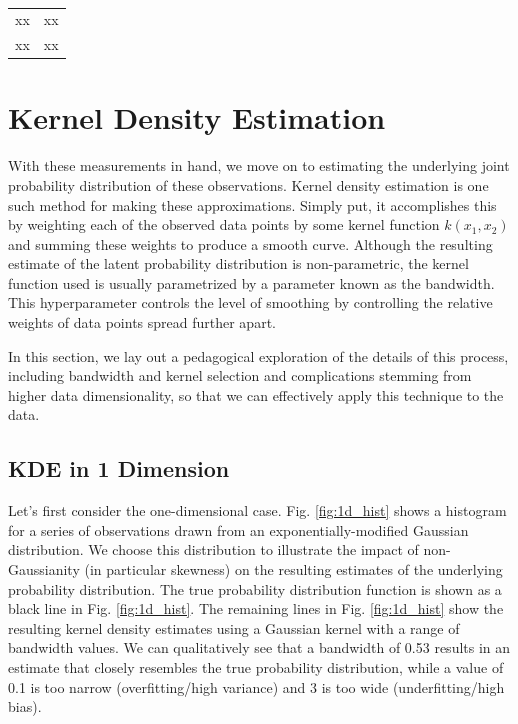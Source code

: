 \begin{table}[h!]
    \centering
    \begin{tabular}{c|c}
        xx & xx \\
        xx & xx
    \end{tabular}
    \caption{}
    \label{tab:snemo_coefs}
\end{table}

\section{Kernel Density Estimation}
\label{sec:kde}
With these measurements in hand, we move on to estimating the underlying joint probability distribution of these observations. Kernel density estimation is one such method for making these approximations. Simply put, it accomplishes this by weighting each of the observed data points by some kernel function $k(x_{1}, x_{2})$ and summing these weights to produce a smooth curve. Although the resulting estimate of the latent probability distribution is non-parametric, the kernel function used is usually parametrized by a parameter known as the bandwidth. This hyperparameter controls the level of smoothing by controlling the relative weights of data points spread further apart.

In this section, we lay out a pedagogical exploration of the details of this process, including bandwidth and kernel selection and complications stemming from higher data dimensionality, so that we can effectively apply this technique to the data.

\subsection{KDE in 1 Dimension}
\label{sec:1d}
Let's first consider the one-dimensional case. Fig. \ref{fig:1d_hist} shows a histogram for a series of observations drawn from an exponentially-modified Gaussian distribution. We choose this distribution to illustrate the impact of non-Gaussianity (in particular skewness) on the resulting estimates of the underlying probability distribution. The true probability distribution function is shown as a black line in Fig. \ref{fig:1d_hist}. The remaining lines in Fig. \ref{fig:1d_hist} show the resulting kernel density estimates using a Gaussian kernel with a range of bandwidth values. We can qualitatively see that a bandwidth of 0.53 results in an estimate that closely resembles the true probability distribution, while a value of 0.1 is too narrow (overfitting/high variance) and 3 is too wide (underfitting/high bias).

